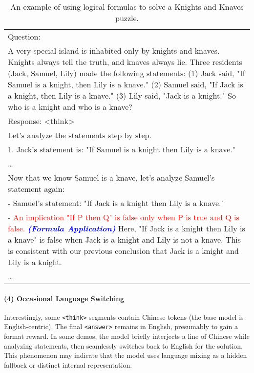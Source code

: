 \begin{table}[H]
\centering
\fontsize{9.5}{10}\selectfont
\begin{tabular}{p{14cm}}
\toprule
Question: \\
A very special island is inhabited only by knights and knaves. Knights always tell the truth, and knaves always lie. Three residents (Jack, Samuel, Lily) made the following statements: (1) Jack said, "If Samuel is a knight, then Lily is a knave." (2) Samuel said, "If Jack is a knight, then Lily is a knave." (3) Lily said, "Jack is a knight." So who is a knight and who is a knave? \\
\midrule
Response: <think> \\
Let's analyze the statements step by step. \\
1. Jack's statement is: "If Samuel is a knight then Lily is a knave." \\
\ldots \\
Now that we know Samuel is a knave, let's analyze Samuel's statement again: \\
- Samuel's statement: "If Jack is a knight then Lily is a knave." \\
\textcolor{red}{- An implication "If P then Q" is false only when P is true and Q is false.}\textcolor{blue}{\textit{\textbf{ (Formula Application)}}} Here, "If Jack is a knight then Lily is a knave" is false when Jack is a knight and Lily is not a knave. This is consistent with our previous conclusion that Jack is a knight and Lily is a knight. \\
\ldots \\
\hline
\end{tabular}
\vspace{5mm}
\caption{An example of using logical formulas to solve a Knights and Knaves puzzle.}
\end{table}

\paragraph{(4) Occasional Language Switching}
Interestingly, some \texttt{<think>} segments contain Chinese tokens (the base model is English-centric). The final \texttt{<answer>} remains in English, presumably to gain a format reward. In some demos, the model briefly interjects a line of Chinese while analyzing statements, then seamlessly switches back to English for the solution. This phenomenon may indicate that the model uses language mixing as a hidden fallback or distinct internal representation. 

